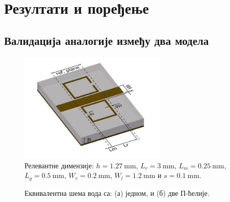 \documentclass[main.tex]{subfiles}
\begin{document}
\section{Резултати и поређење}\label{tsm:sec:res}
\subsection{Валидација аналогије између два модела}
\begin{figure}[!t]
\centering
\includegraphics[width=7cm]{sl_tsm/dim3.jpeg}
\caption{Релевантне димензије:  $h = \SI{1.27}{\mm}$, $L_r = \SI{3}{\mm}$, $L_m = \SI{0.25}{\mm}$, $L_g = \SI{0.5}{\mm}$, $W_r = \SI{0.2}{\mm}$, $W_l = \SI{1.2}{\mm}$ и $s = \SI{0.1}{\mm}$.}
\label{tsm:dim}
\end{figure}
\begin{figure}
    \begin{center}
        \hfil
    \caption{Еквивалентна шема вода са: (а) једном, и (б) две П-ћелије.}
    \label{tsm:sl:vod2cel}
  \end{center}
\end{figure}
\end{document}
